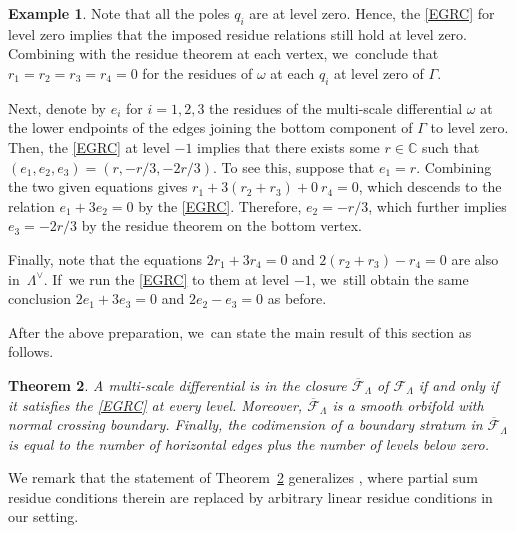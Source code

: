 \documentclass[JEP,XML,SOM,Unicode,NoFloatCountersInSection,published]{cedram}
\newcommand\CC{{\mathbb C}}
\newtheorem{thm}{Theorem}[section]
\theoremstyle{definition}
\newtheorem{ex}[thm]{Example}
\begin{document}
\begin{ex}
Note that all the poles $q_i$ are at level zero. Hence,
the \ref{EGRC} for level zero implies that the imposed residue relations still hold at level zero. Combining with the residue theorem at each vertex, we~conclude that $r_1 = r_{2}=r_{3}= r_4 = 0$ for the residues of $\omega$ at each $q_i$ at level zero of $\Gamma$.

Next, denote by $e_{i}$ for $i=1,2,3$ the residues of the multi-scale differential $\omega$ at the lower endpoints of the edges joining the bottom component of $\Gamma$ to level zero. Then, the \ref{EGRC} at level $-1$ implies
that there exists some $r\in\CC$ such that $(e_{1},e_{2},e_{3}) = (r,-r/3,-2r/3)$. To see this, suppose that $e_{1}=r$. Combining the two given equations gives $r_1 + 3(r_2 + r_3) + 0\ r_4 = 0$, which descends to the relation $e_1 + 3e_2 = 0$ by the \ref{EGRC}. Therefore, $e_2 = - r/3 $, which further implies $e_3 = -2r/3$ by the residue theorem on the bottom vertex.

Finally, note that the equations $2r_1 + 3r_4 = 0$ and
$2(r_2+r_3) - r_4 = 0$ are also in~$\Lambda^{\vee}$. If~we run the \ref{EGRC} to them at level $-1$, we~still obtain the same conclusion $2e_1 + 3e_3 = 0$ and
$2e_2 - e_3 = 0$ as before.
\end{ex}

After the above preparation, we~can state the main result of this section as follows.
\begin{thm}\label{thm:closureMSD}
A multi-scale differential is in the closure $\overline{\mathcal{F}}_{\Lambda}$
of $\mathcal{F}_{\Lambda}$ if and only if it satisfies the \ref{EGRC} at every level.
Moreover, $\overline{\mathcal{F}}_{\Lambda}$ is a smooth orbifold with normal crossing boundary. Finally, the codimension of a boundary stratum in $\overline{\mathcal{F}}_{\Lambda}$ is equal to the number of horizontal edges plus the number of levels below zero.
\end{thm}

We remark that the statement of Theorem~\ref{thm:closureMSD} generalizes \cite[Prop.\,4.2]{CMZ}, where partial sum residue conditions therein are replaced by arbitrary linear residue conditions in our setting.
\end{document}
